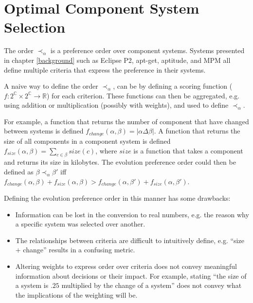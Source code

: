 \section{Optimal Component System Selection}
\label{formal.opt}
The order $\prec_{\alpha}$ is a preference order over component systems.
Systems presented in chapter \ref{background} such as Eclipse P2, apt-get, aptitude, and MPM all define multiple criteria that express the preference in their systems.

A naive way to define the order $\prec_{\alpha}$, can be by defining a scoring function ($f: 2^{\mathbb{C}} \times 2^{\mathbb{C}} \rightarrow \mathbb{R}$) for each criterion. 
These functions can then be aggregated, e.g. using addition or multiplication (possibly with weights), and used to define $\prec_{\alpha}$.

For example, a function that returns the number of component that have changed between systems is defined $f_{change}(\alpha,\beta) = |\alpha \Delta \beta|$.
A function that returns the size of all components in a component system is defined $f_{size}(\alpha,\beta) = \sum \limits_{c \in \beta} size(c)$,
 where $size$ is a function that takes a component and returns its size in kilobytes.
The evolution preference order could then be defined as $\beta \prec_{\alpha} \beta'$ iff $f_{change}(\alpha,\beta) + f_{size}(\alpha,\beta) > f_{change}(\alpha,\beta') + f_{size}(\alpha,\beta')$.

Defining the evolution preference order in this manner has some drawbacks:
\begin{itemize}
  \item Information can be lost in the conversion to real numbers, e.g. the reason why a specific system was selected over another.
  \item The relationships between criteria are difficult to intuitively define, e.g. ``size $+$ change'' results in a confusing metric.
  \item Altering weights to express order over criteria does not convey meaningful information about decisions or their impact.
  For example, stating ``the size of a system is $.25$ multiplied by the change of a system'' does not convey what the implications of the weighting will be.
\end{itemize}

